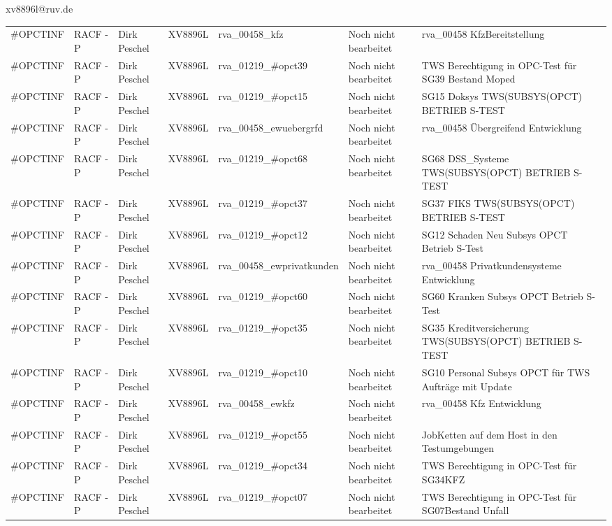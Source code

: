 \documentclass[a4paper,landscape,12pt]{letter}
\begin{document}
\begin{letter}{xv8896l@ruv.de\hfill \break}
\begin{tiny}
\begin{longtable}{|p{35mm}|p{15mm}|p{25mm}|p{10mm}|p{40mm}|p{50mm}|p{50mm}|}
\#OPCTINF & RACF - P & Dirk Peschel & XV8896L & rva\_00458\_kfz & Noch nicht bearbeitet & rva\_00458 KfzBereitstellung \\
\#OPCTINF & RACF - P & Dirk Peschel & XV8896L & rva\_01219\_\#opct39 & Noch nicht bearbeitet & TWS Berechtigung in OPC-Test für SG39 Bestand Moped \\
\#OPCTINF & RACF - P & Dirk Peschel & XV8896L & rva\_01219\_\#opct15 & Noch nicht bearbeitet & SG15 Doksys TWS(SUBSYS(OPCT) BETRIEB S-TEST \\
\#OPCTINF & RACF - P & Dirk Peschel & XV8896L & rva\_00458\_ewuebergrfd & Noch nicht bearbeitet & rva\_00458 Übergreifend Entwicklung \\
\#OPCTINF & RACF - P & Dirk Peschel & XV8896L & rva\_01219\_\#opct68 & Noch nicht bearbeitet & SG68 DSS\_Systeme TWS(SUBSYS(OPCT) BETRIEB S-TEST \\
\#OPCTINF & RACF - P & Dirk Peschel & XV8896L & rva\_01219\_\#opct37 & Noch nicht bearbeitet & SG37 FIKS TWS(SUBSYS(OPCT) BETRIEB S-TEST \\
\#OPCTINF & RACF - P & Dirk Peschel & XV8896L & rva\_01219\_\#opct12 & Noch nicht bearbeitet & SG12 Schaden Neu Subsys OPCT Betrieb S-Test \\
\#OPCTINF & RACF - P & Dirk Peschel & XV8896L & rva\_00458\_ewprivatkunden & Noch nicht bearbeitet & rva\_00458 Privatkundensysteme Entwicklung \\
\#OPCTINF & RACF - P & Dirk Peschel & XV8896L & rva\_01219\_\#opct60 & Noch nicht bearbeitet & SG60 Kranken Subsys OPCT Betrieb S-Test \\
\#OPCTINF & RACF - P & Dirk Peschel & XV8896L & rva\_01219\_\#opct35 & Noch nicht bearbeitet & SG35 Kreditversicherung TWS(SUBSYS(OPCT) BETRIEB S-TEST \\
\#OPCTINF & RACF - P & Dirk Peschel & XV8896L & rva\_01219\_\#opct10 & Noch nicht bearbeitet & SG10 Personal Subsys OPCT für TWS Aufträge mit Update \\
\#OPCTINF & RACF - P & Dirk Peschel & XV8896L & rva\_00458\_ewkfz & Noch nicht bearbeitet & rva\_00458 Kfz Entwicklung \\
\#OPCTINF & RACF - P & Dirk Peschel & XV8896L & rva\_01219\_\#opct55 & Noch nicht bearbeitet & JobKetten auf dem Host in den Testumgebungen \\
\#OPCTINF & RACF - P & Dirk Peschel & XV8896L & rva\_01219\_\#opct34 & Noch nicht bearbeitet & TWS Berechtigung in OPC-Test für SG34KFZ \\
\#OPCTINF & RACF - P & Dirk Peschel & XV8896L & rva\_01219\_\#opct07 & Noch nicht bearbeitet & TWS Berechtigung in OPC-Test für SG07Bestand Unfall \\

\end{longtable}
\end{tiny}
\end{letter}
\end{document}

